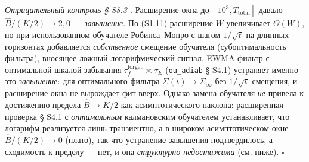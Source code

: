 \documentclass[12pt]{iopart}
\begin{document}
\emph{Отрицательный контроль § S8.3 \cite{Andriishin2026b}.} Расширение окна до \([10^3, T_{\text{total}}]\) давало \(\hat B/(K/2) \to 2{,}0\) --- \emph{завышение}. По (S1.11) расширение \(W\) увеличивает \(\Theta(W)\), но при использованном обучателе Робинса--Монро с шагом \(1/\sqrt t\) на длинных горизонтах добавляется \emph{собственное} смещение обучателя (субоптимальность фильтра), вносящее ложный логарифмический сигнал. EWMA-фильтр с оптимальной шкалой забывания \(\tau_f^{\text{forget}} \asymp \tau_E\) (\texttt{ou\_adiab} § S4.1) устраняет именно это \emph{завышение}: для оптимального фильтра \(\Sigma(t) \to \Sigma_\infty\) без \(1/\sqrt t\)-смещения, и расширение окна не вырождает фит вверх. Однако замена обучателя \emph{не} привела к достижению предела \(\hat B \to K/2\) как асимптотического наклона: расширенная проверка § S4.1 с \emph{оптимальным} калмановским обучателем устанавливает, что логарифм реализуется лишь транзиентно, а в широком асимптотическом окне \(\hat B/(K/2) \to 0\) (плато), так что устранение завышения подтвердилось, а сходимость к пределу --- нет, и она \emph{структурно недостижима} (см. ниже). \(\square\)
\end{document}
